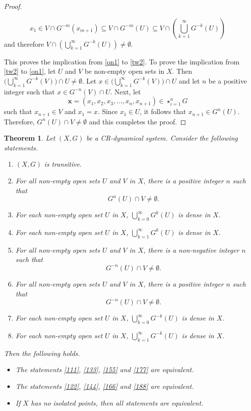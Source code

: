 \documentclass[a4paper,12pt]{article} %
\newtheorem{theorem}{Theorem}[section]
\begin{document}
\begin{proof}
\begin{enumerate}
 $$
 x_1\in V\cap G^{-m}(x_{m+1})\subseteq V\cap G^{-m}(U)\subseteq V\cap \left(\bigcup_{k=1}^{\infty}G^{-k}(U)\right)
 $$
 and therefore $V\cap \left(\bigcup_{k=1}^{\infty}G^{-k}(U)\right)\neq \emptyset$.
\end{enumerate}
This proves the implication from \ref{on1} to \ref{tw2}. To prove the implication  from \ref{tw2} to \ref{on1}, let $U$ and $V$ be non-empty open sets in $X$.  Then $\Big(\bigcup_{k=1}^{\infty}G^{-k}(V)\Big)\cap U\neq \emptyset$.  Let $x\in  \Big(\bigcup_{k=1}^{\infty}G^{-k}(V)\Big)\cap U$ and let $n$ be a positive integer such that $x\in G^{-n}(V)\cap U$. Next, let
$$
\mathbf x=(x_1,x_2,x_3,\ldots ,x_n,x_{n+1})\in \star_{i=1}^{n}G
$$
such that $x_{n+1}\in V$ and $x_1=x$.  Since $x_1\in U$, it follows that $x_{n+1}\in G^n(U)$. Therefore, $G^{n}(U)\cap V\neq \emptyset$ and this completes the proof.
\end{proof}


\begin{theorem}\label{transitiveCHARACTERIZATION11}
Let $(X,G)$ be a CR-dynamical system.  Consider the following statements. 
\begin{enumerate}
\item \label{111} $(X,G)$ is  transitive.
\item \label{122} For all non-empty open sets $U$ and $V$ in $X$,  there is a positive integer $n$ such that 
$$
G^{n}(U)\cap V\neq \emptyset.
$$
\item \label{133} For each non-empty open set $U$ in $X$,  $\bigcup_{k=0}^{\infty}G^{k}(U)$ is dense in $X$.
\item \label{144} For each non-empty open set $U$ in $X$,  $\bigcup_{k=1}^{\infty}G^{k}(U)$ is dense in $X$.
\item \label{155} For all non-empty open sets $U$ and $V$ in $X$,  there is a non-negative integer $n$ such that 
$$
G^{-n}(U)\cap V\neq \emptyset.
$$
\item \label{166} For all non-empty open sets $U$ and $V$ in $X$,  there is a positive integer $n$ such that 
$$
G^{-n}(U)\cap V\neq \emptyset.
$$
\item \label{177} For each non-empty open set $U$ in $X$,  $\bigcup_{k=0}^{\infty}G^{-k}(U)$ is dense in $X$.
\item \label{188} For each non-empty open set $U$ in $X$,  $\bigcup_{k=1}^{\infty}G^{-k}(U)$ is dense in $X$.
\end{enumerate}
Then the following holds.
\begin{itemize}
\item The statements \ref{111}, \ref{133}, \ref{155} and \ref{177} are equivalent.
\item The statements \ref{122}, \ref{144}, \ref{166} and \ref{188} are equivalent.
\item If $X$ has no isolated points, then all statements are equivalent.
\end{itemize}
\end{theorem}
\end{document}
